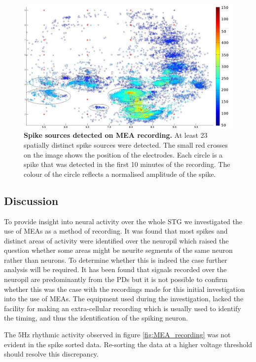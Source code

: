 \begin{figure}[H]
	\begin{center}
		\includegraphics[width=\columnwidth]{graphics/MEA_analysis2a.png}
		\caption[Spike sources detected on \ac{MEA} recording. ]{\textbf{Spike sources detected on \ac{MEA} recording. }At least 23 spatially distinct spike sources were detected. The small red crosses on the image shows the position of the electrodes. Each circle is a spike that was detected in the first 10 minutes of the recording. The colour of the circle reflects a normalised amplitude of the spike.}
		\label{fig:MEA_analysis2}
	\end{center}
\end{figure}

\subsection{Discussion}
To provide insight into neural activity over the whole \ac{STG} we investigated the use of \acp{MEA} as a method of recording. It was found that most spikes and distinct areas of activity were identified over the neuropil which raised the question whether some areas might be neurite segments of the same neuron rather than neurons. To determine whether this is indeed the case further analysis will be required. It has been found that signals recorded over the neuropil are predominantly from the \acp{PD} but it is not possible to confirm whether this was the case with the recordings made for this initial investigation into the use of \acp{MEA}. The equipment used during the investigation, lacked the facility for making an extra-cellular recording which is usually used to identify the timing, and thus the identification of the spiking neuron.

The 5Hz rhythmic activity observed in figure \ref{fig:MEA_recording} was not evident in the spike sorted data. Re-sorting the data at a higher voltage threshold should resolve this discrepancy.

